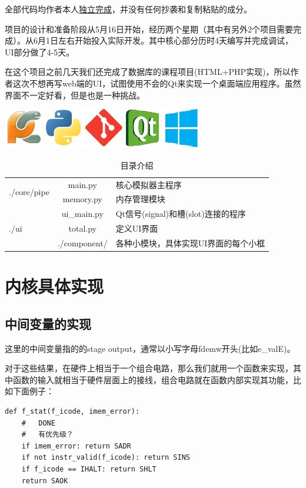 \documentclass{article}
\begin{document}
全部代码均作者本人\underline{独立完成}，并没有任何抄袭和复制粘贴的成分。

项目的设计和准备阶段从5月16日开始，经历两个星期（其中有另外2个项目需要完成）。从6月1日左右开始投入实际开发。其中核心部分历时4天编写并完成调试，UI部分做了4-5天。

在这个项目之前几天我们还完成了数据库的课程项目(HTML+PHP实现)，所以作者这次不想再写web端的UI，试图使用不会的Qt来实现一个桌面端应用程序。虽然界面不一定好看，但是也是一种挑战。

\begin{center}
\includegraphics{software.png}
\end{center}

\begin{center}
\begin{table}[!ht]     %
\centering
\caption{目录介绍}
\large
\begin{tabular}{|l|c|l|}
\hline
\multirow{2}{*}{./core/pipe} & main.py & 核心模拟器主程序\\
\cline{2-3}
& memory.py & 内存管理模块\\
\hline
\multirow{3}{*}{./ui} & ui\_main.py & Qt信号(signal)和槽(slot)连接的程序\\
\cline{2-3}
& total.py & 定义UI界面\\
\cline{2-3}
& ./component/ & 各种小模块，具体实现UI界面的每个小框\\
\hline
\end{tabular}
\end{table}
\end{center}

\section{内核具体实现}
\subsection{中间变量的实现}
这里的中间变量指的的stage output，通常以小写字母fdemw开头(比如e\_valE)。

对于这些结果，在硬件上相当于一个组合电路，那么我们就用一个函数来实现，其中函数的输入就相当于硬件层面上的接线，组合电路就在函数内部实现其功能，比如下面例子：

\begin{lstlisting}[frame=single]
def f_stat(f_icode, imem_error):
    #   DONE
    #   有优先级？
    if imem_error: return SADR
    if not instr_valid(f_icode): return SINS
    if f_icode == IHALT: return SHLT
    return SAOK

\end{lstlisting}
\end{document}
